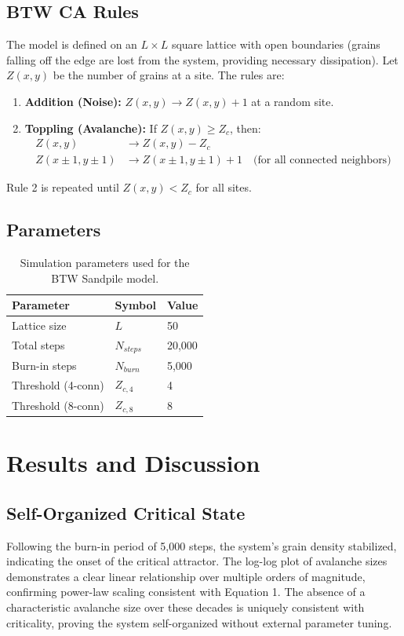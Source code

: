 \documentclass[11pt, a4paper]{article}
\begin{document}
\subsection{BTW CA Rules}
The model is defined on an $L \times L$ square lattice with open boundaries (grains falling off the edge are lost from the system, providing necessary dissipation). Let $Z(x,y)$ be the number of grains at a site. The rules are:
\begin{enumerate}
    \item \textbf{Addition (Noise):} $Z(x,y) \rightarrow Z(x,y) + 1$ at a random site.
    \item \textbf{Toppling (Avalanche):} If $Z(x,y) \ge Z_c$, then:
    \begin{align*}
        Z(x,y) &\rightarrow Z(x,y) - Z_c \\
        Z(x \pm 1, y \pm 1) &\rightarrow Z(x \pm 1, y \pm 1) + 1 \quad \text{(for all connected neighbors)}
    \end{align*}
\end{enumerate}
Rule 2 is repeated until $Z(x,y) < Z_c$ for all sites.

\subsection{Parameters}
\begin{table}[H]
\centering
\begin{tabular}{lll}
\toprule
\textbf{Parameter} & \textbf{Symbol} & \textbf{Value} \\
\midrule
Lattice size & $L$ & 50 \\
Total steps & $N_{steps}$ & 20,000 \\
Burn-in steps & $N_{burn}$ & 5,000 \\
Threshold (4-conn) & $Z_{c, 4}$ & 4 \\
Threshold (8-conn) & $Z_{c, 8}$ & 8 \\
\bottomrule
\end{tabular}
\caption{Simulation parameters used for the BTW Sandpile model.}
\end{table}

\section{Results and Discussion}

\subsection{Self-Organized Critical State}
Following the burn-in period of 5,000 steps, the system's grain density stabilized, indicating the onset of the critical attractor. The log-log plot of avalanche sizes demonstrates a clear linear relationship over multiple orders of magnitude, confirming power-law scaling consistent with Equation 1. The absence of a characteristic avalanche size over these decades is uniquely consistent with criticality, proving the system self-organized without external parameter tuning.
\end{document}
